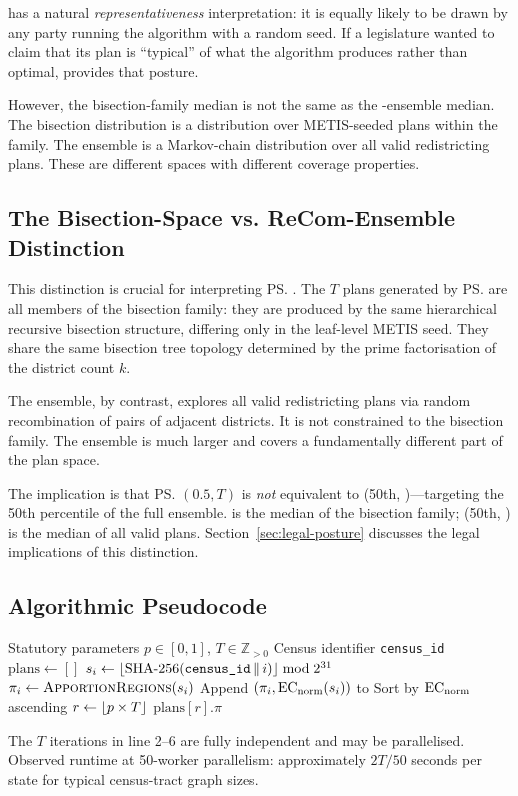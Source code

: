 \ms{} has a natural \emph{representativeness} interpretation: it is equally
likely to be drawn by any party running the algorithm with a random seed.
If a legislature wanted to claim that its plan is ``typical'' of what the
algorithm produces rather than optimal, \ms{} provides that posture.

However, the bisection-family median is not the same as the \recom{}-ensemble
median.
The bisection distribution is a distribution over METIS-seeded plans
within the \ar{} family.
The \recom{} ensemble is a Markov-chain distribution over all valid
redistricting plans.
These are different spaces with different coverage properties.

\subsection{The Bisection-Space vs. ReCom-Ensemble Distinction}

This distinction is crucial for interpreting \ps{}.
The $T$ plans generated by \ps{} are all members of the \ar{} bisection
family: they are produced by the same hierarchical recursive bisection
structure, differing only in the leaf-level METIS seed.
They share the same bisection tree topology determined by the prime
factorisation of the district count $k$.

The \recom{} ensemble, by contrast, explores all valid redistricting plans
via random recombination of pairs of adjacent districts.
It is not constrained to the bisection family.
The \recom{} ensemble is much larger and covers a fundamentally different
part of the plan space.

The implication is that \ps{}$(0.5, T)$ is \emph{not} equivalent to
\ts{}(50th, \recom{})---targeting the 50th percentile of the full
\recom{} ensemble.
\ms{} is the median of the bisection family; \ts{}(50th, \recom{}) is
the median of all valid plans.
Section~\ref{sec:legal-posture} discusses the legal implications of this
distinction.

\subsection{Algorithmic Pseudocode}

\begin{algorithm}
\caption{\ps{}$(p, T)$}
\label{alg:percentile-sweep}
\begin{algorithmic}[1]
\Require Statutory parameters $p \in [0,1]$, $T \in \mathbb{Z}_{>0}$
\Require Census identifier \texttt{census\_id}
\State $\text{plans} \leftarrow []$
  \State $s_i \leftarrow \lfloor \text{SHA-256}(\texttt{census\_id} \,\|\, i) \rfloor \bmod 2^{31}$
  \State $\pi_i \leftarrow \textsc{ApportionRegions}{}(s_i)$  
  \State Append $(\pi_i, \mathrm{EC}_{\mathrm{norm}}(s_i))$ to 
\EndFor
\State Sort  by $\mathrm{EC}_{\mathrm{norm}}$ ascending 
\State $r \leftarrow \lfloor p \times T \rfloor$
\State \Return $\text{plans}[r].\pi$
\end{algorithmic}
\end{algorithm}

The $T$ iterations in line 2--6 are fully independent and may be
parallelised.
Observed runtime at 50-worker parallelism: approximately $2T/50$
seconds per state for typical census-tract graph sizes.
